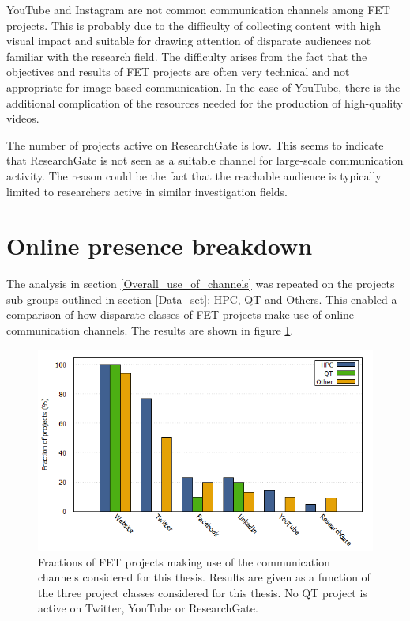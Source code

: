 YouTube and Instagram are not common communication channels among FET projects. This is probably due to the difficulty of collecting content with high visual impact and suitable for drawing attention of disparate audiences not familiar with the research field. The difficulty arises from the fact that the objectives and results of FET projects are often very technical and not appropriate for image-based communication. In the case of YouTube, there is the additional complication of the resources needed for the production of high-quality videos.

The number of projects active on ResearchGate is low. This seems to indicate that ResearchGate is not seen as a suitable channel for large-scale communication activity. The reason could be the fact that the reachable audience is typically limited to researchers active in similar investigation fields.

\section{Online presence breakdown} \label{Online_presence_breakdown}
The analysis in section \ref{Overall_use_of_channels} was repeated on the projects sub-groups outlined in section \ref{Data_set}: HPC, QT and Others. This enabled a comparison of how disparate classes of FET projects make use of online communication channels. The results are shown in figure \ref{Social_media_breakdown}. 

\begin{figure}[!t] 
 \begin{center}
 \includegraphics[scale=0.4]{Images/Social_media_breakdown.png}
 \caption{Fractions of FET projects making use of the communication channels considered for this thesis. Results are given as a function of the three project classes considered for this thesis. No QT project is active on Twitter, YouTube or ResearchGate.}
 \label{Social_media_breakdown}
 \end{center}
\end{figure}

